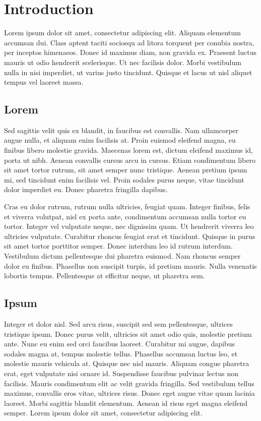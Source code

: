 \chapter{Introduction}

 Lorem ipsum dolor sit amet, consectetur adipiscing elit. Aliquam elementum accumsan dui. Class aptent taciti sociosqu ad litora torquent per conubia nostra, per inceptos himenaeos. Donec id maximus diam, non gravida ex. Praesent luctus mauris ut odio hendrerit scelerisque. Ut nec facilisis dolor. Morbi vestibulum nulla in nisi imperdiet, ut varius justo tincidunt. Quisque et lacus ut nisl aliquet tempus vel laoreet massa.
 \section{Lorem}
Sed sagittis velit quis ex blandit, in faucibus est convallis. Nam ullamcorper augue nulla, et aliquam enim facilisis at. Proin euismod eleifend magna, eu finibus libero molestie gravida. Maecenas lorem est, dictum eleifend maximus id, porta ut nibh. Aenean convallis cursus arcu in cursus. Etiam condimentum libero sit amet tortor rutrum, sit amet semper nunc tristique. Aenean pretium ipsum mi, sed tincidunt enim facilisis vel. Proin sodales purus neque, vitae tincidunt dolor imperdiet eu. Donec pharetra fringilla dapibus.

Cras eu dolor rutrum, rutrum nulla ultricies, feugiat quam. Integer finibus, felis et viverra volutpat, nisl ex porta ante, condimentum accumsan nulla tortor eu tortor. Integer vel vulputate neque, nec dignissim quam. Ut hendrerit viverra leo ultricies vulputate. Curabitur rhoncus feugiat erat et tincidunt. Quisque in purus sit amet tortor porttitor semper. Donec interdum leo id rutrum interdum. Vestibulum dictum pellentesque dui pharetra euismod. Nam rhoncus semper dolor eu finibus. Phasellus non suscipit turpis, id pretium mauris. Nulla venenatis lobortis tempus. Pellentesque at efficitur neque, ut pharetra sem.
\section{Ipsum}
Integer et dolor nisl. Sed arcu risus, suscipit sed sem pellentesque, ultrices tristique ipsum. Donec purus velit, ultricies sit amet odio quis, molestie pretium ante. Nunc eu enim sed orci faucibus laoreet. Curabitur mi augue, dapibus sodales magna at, tempus molestie tellus. Phasellus accumsan luctus leo, et molestie mauris vehicula at. Quisque nec nisl mauris. Aliquam congue pharetra erat, eget vulputate nisi ornare id. Suspendisse faucibus pulvinar lectus non facilisis. Mauris condimentum elit ac velit gravida fringilla. Sed vestibulum tellus maximus, convallis eros vitae, ultrices risus. Donec eget augue vitae quam lacinia laoreet. Morbi sagittis blandit elementum. Aenean id risus eget magna eleifend semper. Lorem ipsum dolor sit amet, consectetur adipiscing elit. 
